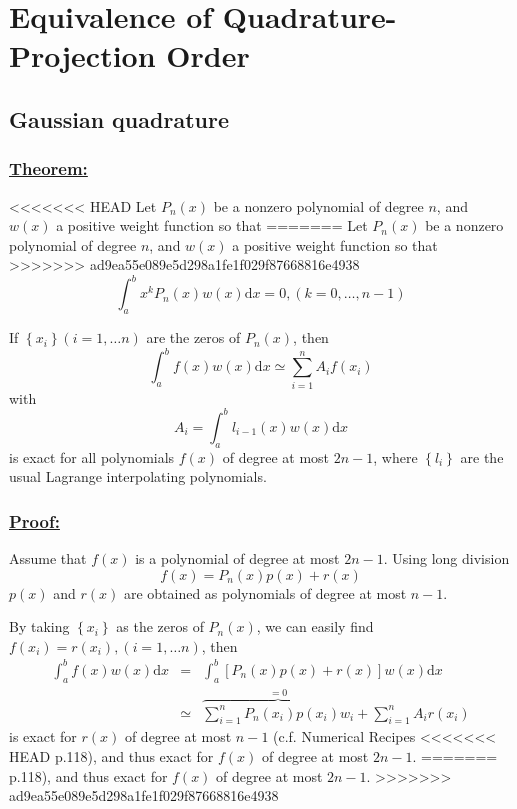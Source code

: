 
\chapter{Equivalence of Quadrature-Projection Order\label{chpt:equivalence-of-quadrature-projection-order}}


\section{Gaussian quadrature\label{sec:Gaussian-quadrature}}


\subsection*{\uline{Theorem:} }

<<<<<<< HEAD
Let $P_{n}(x)$ be a nonzero polynomial of degree $n$, and $w(x)$
a positive weight function so that
=======
Let $P_{n}(x)$ be a nonzero polynomial of degree $n$, and $w(x)$ a
positive weight function so that
>>>>>>> ad9ea55e089e5d298a1fe1f029f87668816e4938
\begin{equation}
\int_{a}^{b}x^{k}P_{n}(x)w(x)\mathrm{d}x=0,(k=0,\ldots,n-1)
\end{equation}


If $\left\{ x_{i}\right\} (i=1,\ldots n)$ are the zeros of $P_{n}(x)$,
then
\begin{equation}
\int_{a}^{b}f(x)w(x)\mathrm{d}x\simeq\sum_{i=1}^{n}A_{i}f(x_{i})
\end{equation}
with
\begin{equation}
A_{i}=\int_{a}^{b}l_{i-1}(x)w(x)\mathrm{d}x
\end{equation}
is exact for all polynomials $f(x)$ of degree at most $2n-1$, where
$\left\{ l_{i}\right\} $ are the usual Lagrange interpolating polynomials.


\subsection*{\uline{Proof: }}

Assume that $f(x)$ is a polynomial of degree at most $2n-1$. Using
long division
\begin{equation}
f(x)=P_{n}(x)p(x)+r(x)
\end{equation}
$p(x)$ and $r(x)$ are obtained as polynomials of degree at most
$n-1$.

By taking $\left\{ x_{i}\right\} $ as the zeros of $P_{n}(x)$, we
can easily find $f(x_{i})=r(x_{i}),(i=1,\ldots n)$, then
\begin{eqnarray}
\int_{a}^{b}f(x)w(x)\mathrm{d}x & = & \int_{a}^{b}\left[P_{n}(x)p(x)+r(x)\right]w(x)\mathrm{d}x\nonumber \\
 & \simeq & \stackrel{=0}{\overbrace{\sum_{i=1}^{n}P_{n}(x_{i})p(x_{i})w_{i}}}+\sum_{i=1}^{n}A_{i}r(x_{i})
\end{eqnarray}
is exact for $r(x)$ of degree at most $n-1$ (c.f. Numerical Recipes
<<<<<<< HEAD
\citep{Numerical_Recipes_3ed} p.118), and thus exact for $f(x)$
of degree at most $2n-1$.
=======
\citep{Numerical_Recipes_3ed} p.118), and thus exact for $f(x)$ of degree
at most $2n-1$.
>>>>>>> ad9ea55e089e5d298a1fe1f029f87668816e4938


